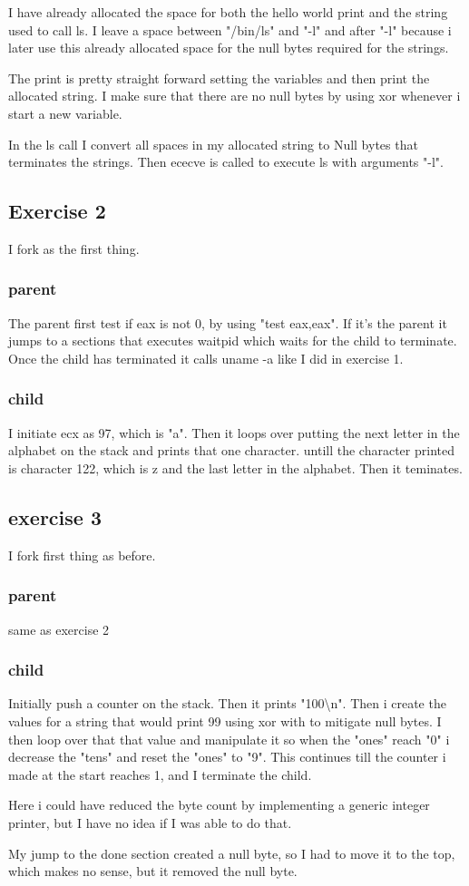 \documentclass{article}
\begin{document}
I have already allocated the space for both the hello world print and the string used to call ls. I leave a space between "/bin/ls" and "-l" and after "-l" because i later use this already allocated space for the null bytes required for the strings.

The print is pretty straight forward setting the variables and then print the allocated string. I make sure that there are no null bytes by using xor whenever i start a new variable.

In the ls call I convert all spaces in my allocated string to Null bytes that terminates the strings. Then ececve is called to execute ls with arguments "-l".

\subsection{Exercise 2}
I fork as the first thing.
\subsubsection{parent}
The parent first test if eax is not 0, by using "test eax,eax". If it's the parent it jumps to a sections that executes waitpid which waits for the child to terminate. Once the child has terminated it calls uname -a like I did in exercise 1.
\subsubsection{child}
I initiate ecx as 97, which is "a". Then it loops over putting the next letter in the  alphabet on the stack and prints that one character. untill the character printed is character 122, which is z and the last letter in the alphabet. Then it teminates.

\subsection{exercise 3}
I fork first thing as before.
\subsubsection{parent}
same as exercise 2
\subsubsection{child}
Initially push a counter on the stack. Then it prints "100\textbackslash n". Then i create the values for a string that would print 99 using xor with to mitigate null bytes. I then loop over that that value and manipulate it so when the "ones" reach "0" i decrease the "tens" and reset the "ones" to "9". This continues till the counter i made at the start reaches 1, and I terminate the child.

Here i could have reduced the byte count by implementing a generic integer printer, but I have no idea if I was able to do that.

My jump to the done section created a null byte, so I had to move it to the top, which makes no sense, but it removed the null byte.
\end{document}
